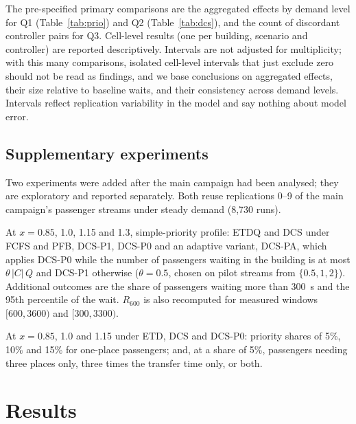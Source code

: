 \documentclass[12pt,a4paper]{article}
\begin{document}
The pre-specified primary comparisons are the aggregated effects by demand level for Q1 (Table~\ref{tab:prio}) and Q2 (Table~\ref{tab:dcs}), and the count of discordant controller pairs for Q3. Cell-level results (one per building, scenario and controller) are reported descriptively. Intervals are not adjusted for multiplicity; with this many comparisons, isolated cell-level intervals that just exclude zero should not be read as findings, and we base conclusions on aggregated effects, their size relative to baseline waits, and their consistency across demand levels. Intervals reflect replication variability in the model and say nothing about model error.

\subsection{Supplementary experiments}\label{sec:supp}
Two experiments were added after the main campaign had been analysed; they are exploratory and reported separately. Both reuse replications 0--9 of the main campaign's passenger streams under steady demand (8,730 runs).
\begin{description}[leftmargin=2.2em,style=nextline,itemsep=1pt]
\item[S1: distribution and overload] At $x=0.85$, 1.0, 1.15 and 1.3, simple-priority profile: ETDQ and DCS under FCFS and PFB, DCS-P1, DCS-P0 and an adaptive variant, DCS-PA, which applies DCS-P0 while the number of passengers waiting in the building is at most $\theta\,|C|\,Q$ and DCS-P1 otherwise ($\theta=0.5$, chosen on pilot streams from $\{0.5,1,2\}$). Additional outcomes are the share of passengers waiting more than 300~s and the 95th percentile of the wait. $R_{600}$ is also recomputed for measured windows $[600,3600)$ and $[300,3300)$.
\item[S2: sensitivity] At $x=0.85$, 1.0 and 1.15 under ETD, DCS and DCS-P0: priority shares of 5\%, 10\% and 15\% for one-place passengers; and, at a share of 5\%, passengers needing three places only, three times the transfer time only, or both.
\end{description}

\section{Results}\label{sec:results}
\end{document}
